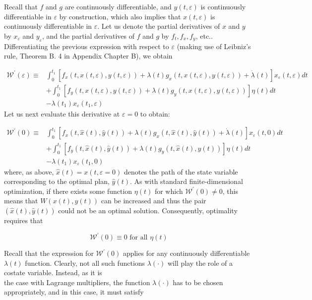 \documentclass[\topdir/lecture_notes.tex]{subfiles}
\begin{document}
Recall that $f$ and $g$ are continuously differentiable, and $y(t, \varepsilon)$ is continuously differentiable in $\varepsilon$ by construction, which also implies that $x(t, \varepsilon)$ is continuously differentiable in $\varepsilon$. Let us denote the partial derivatives of $x$ and $y$ by $x_{\varepsilon}$ and $y_{\varepsilon}$, and the partial derivatives of $f$ and $g$ by $f_{t}, f_{x}, f_{y}$, etc.. Differentiating the previous expression with respect to $\varepsilon$ (making use of Leibniz's rule, Theorem B. 4 in Appendix Chapter B), we obtain

\[
\begin{aligned}
\mathcal{W}^{\prime}(\varepsilon) \equiv & \int_{0}^{t_{1}}\left[f_{x}(t, x(t, \varepsilon), y(t, \varepsilon))+\lambda(t) g_{x}(t, x(t, \varepsilon), y(t, \varepsilon))+\dot{\lambda}(t)\right] x_{\varepsilon}(t, \varepsilon) d t \\
& +\int_{0}^{t_{1}}\left[f_{y}(t, x(t, \varepsilon), y(t, \varepsilon))+\lambda(t) g_{y}(t, x(t, \varepsilon), y(t, \varepsilon))\right] \eta(t) d t \\
& -\lambda\left(t_{1}\right) x_{\varepsilon}\left(t_{1}, \varepsilon\right)
\end{aligned}
\]
Let us next evaluate this derivative at $\varepsilon=0$ to obtain:

\[
\begin{aligned}
\mathcal{W}^{\prime}(0) \equiv & \int_{0}^{t_{1}}\left[f_{x}(t, \hat{x}(t), \hat{y}(t))+\lambda(t) g_{x}(t, \hat{x}(t), \hat{y}(t))+\dot{\lambda}(t)\right] x_{\varepsilon}(t, 0) d t \\
& +\int_{0}^{t_{1}}\left[f_{y}(t, \hat{x}(t), \hat{y}(t))+\lambda(t) g_{y}(t, \hat{x}(t), \hat{y}(t))\right] \eta(t) d t \\
& -\lambda\left(t_{1}\right) x_{\varepsilon}\left(t_{1}, 0\right)
\end{aligned}
\]
where, as above, $\hat{x}(t)=x(t, \varepsilon=0)$ denotes the path of the state variable corresponding to the optimal plan, $\hat{y}(t)$. As with standard finite-dimensional optimization, if there exists some function $\eta(t)$ for which $\mathcal{W}^{\prime}(0) \neq 0$, this means that $W(x(t), y(t))$ can be increased and thus the pair $(\hat{x}(t), \hat{y}(t))$ could not be an optimal solution. Consequently, optimality requires that

\[
\mathcal{W}^{\prime}(0) \equiv 0 \text { for all } \eta(t)
\]

Recall that the expression for $\mathcal{W}^{\prime}(0)$ applies for any continuously differentiable $\lambda(t)$ function. Clearly, not all such functions $\lambda(\cdot)$ will play the role of a costate variable. Instead, as it is\\
the case with Lagrange multipliers, the function $\lambda(\cdot)$ has to be chosen appropriately, and in this case, it must satisfy
\end{document}
